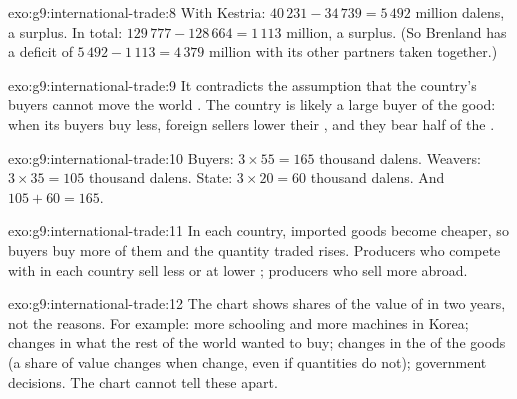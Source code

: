 \begin{solution}{exo:g9:international-trade:8}
With Kestria: $40\,231 - 34\,739 = 5\,492$ million dalens, a surplus. In total: $129\,777 - 128\,664 =
1\,113$ million, a surplus. (So Brenland has a deficit of $5\,492 - 1\,113 = 4\,379$ million with its other
partners taken together.)
\end{solution}

\begin{solution}{exo:g9:international-trade:9}
It contradicts the assumption that the country's buyers cannot move the world . The country is likely
a large buyer of the good: when its buyers buy less, foreign sellers lower their , and they bear half
of the .
\end{solution}

\begin{solution}{exo:g9:international-trade:10}
Buyers: $3 \times 55 = 165$ thousand dalens. Weavers: $3 \times 35 = 105$ thousand dalens. State:
$3 \times 20 = 60$ thousand dalens. And $105 + 60 = 165$.
\end{solution}

\begin{solution}{exo:g9:international-trade:11}
In each country, imported goods become cheaper, so buyers buy more of them and the quantity traded rises.
Producers who compete with  in each country sell less or at lower ; producers who  sell
more abroad.
\end{solution}

\begin{solution}{exo:g9:international-trade:12}
The chart shows shares of the value of  in two years, not the reasons. For example: more schooling
and more machines in Korea; changes in what the rest of the world wanted to buy; changes in the  of
the goods (a share of value changes when  change, even if quantities do not); government decisions.
The chart cannot tell these apart.
\end{solution}

